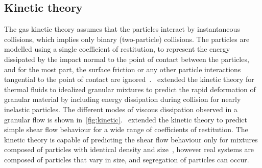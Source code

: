 \subsection{Kinetic theory}
The gas kinetic theory assumes that the particles interact by instantaneous 
collisions, which implies only binary (two-particle) collisions. The particles 
are modelled using a single coefficient of restitution, to represent the energy 
dissipated by the impact normal to the point of contact between the particles, 
and for the most part, the surface friction or any other particle interactions 
tangential to the point of contact are 
ignored~\citep{Campbell1990}.~\citet{Jenkins1983} extended the kinetic theory 
for thermal fluids to idealized granular mixtures to predict the rapid 
deformation of granular material by including energy dissipation during 
collision for nearly inelastic particles. The different modes of viscous 
dissipation observed in a granular flow is shown 
in~\cref{fig:kinetic}.~\citet{Savage1981} extended the 
kinetic theory to predict simple shear flow behaviour for a wide range of 
coefficients of restitution. The kinetic theory is capable of predicting the 
shear flow behaviour only for mixtures composed of particles with identical 
density and size~\citep{Iddir2005}, however real systems are composed of 
particles that vary in size, and segregation of particles can occur. 


